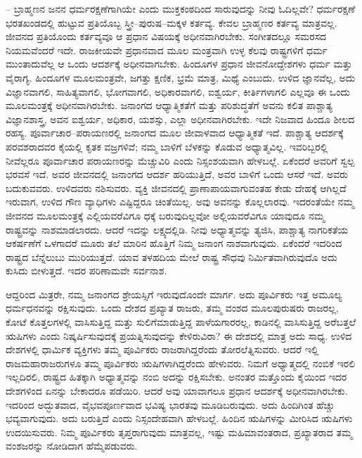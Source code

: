 – ಬ್ರಾಹ್ಮಣನ ಜನನ ಧರ್ಮರಕ್ಷಣೆಗಾಗಿಯೇ ಎಂದು ಮುಕ್ತಕಂಠದಿಂದ ಸಾರುವುದನ್ನು ನೀವು ಓದಿಲ್ಲವೇ? ಧರ್ಮರಕ್ಷಣೆ ಭರತಖಂಡದಲ್ಲಿ ಹುಟ್ಟುವ ಪ್ರತಿಯೊಬ್ಬ ಸ್ತ್ರೀ–ಪುರುಷ–ಮಕ್ಕಳ ಕರ್ತವ್ಯ. ಕೇವಲ ಬ್ರಾಹ್ಮಣರ ಕರ್ತವ್ಯ ಮಾತ್ರವಲ್ಲ. ಜೀವನದ ಪ್ರತಿಯೊಂದು ಕರ್ತವ್ಯವೂ ಆ ಪ್ರಧಾನ ವಿಷಯಕ್ಕೆ ಅಧೀನವಾಗಿರಬೇಕು. ಸಂಗೀತದಲ್ಲೂ ಸಮರಸದ ನಿಯಮವೆಂದರೆ ಇದೇ. ರಾಜಕೀಯವೇ ಪ್ರಧಾನವಾದ ಮೂಲ ಮಂತ್ರವಾಗಿ ಉಳ್ಳ ಕೆಲವು ರಾಷ್ಟ್ರಗಳಿಗೆ ಧರ್ಮ ಮುಂತಾದುವೆಲ್ಲ ಆ ಒಂದು ಆದರ್ಶಕ್ಕೆ ಅಧೀನವಾಗಬೇಕು. ಹಿಂದೂಗಳ ಪ್ರಧಾನ ಜೀವನೋದ್ದೇಶಗಳು ಧರ್ಮ ಮತ್ತು ವೈರಾಗ್ಯ. ಹಿಂದೂಗಳ ಮೂಲಮಂತ್ರವೇ, ಜಗತ್ತು ಕ್ಷಣಿಕ, ಭ್ರಮೆ ಮಾತ್ರ, ಮಿಥ್ಯೆ ಎಂಬುದು. ಉಳಿದ ಜ್ಞಾನವೆಲ್ಲ, ಅದು ವಿಜ್ಞಾನವಾಗಲಿ, ಸಾಹಿತ್ಯವಾಗಲಿ, ಭೋಗವಾಗಲಿ, ಅಧಿಕಾರವಾಗಲಿ, ಐಶ್ವರ್ಯ, ಕೀರ್ತಿಗಳಾಗಲಿ ಎಲ್ಲವೂ ಈ ಒಂದು ಮೂಲಮಂತ್ರಕ್ಕೆ ಅಧೀನವಾಗಿರಬೇಕು. ಜನಾಂಗದ ಆಧ್ಯಾತ್ಮಿಕತೆಗೆ ಮತ್ತು ಪರಿಶುದ್ಧತೆಗೆ ಅವನು ಕಲಿತ ಪಾಶ್ಚಾತ್ಯ ವಿಜ್ಞಾನಶಾಸ್ತ್ರ, ಅವನ ಐಶ್ವರ್ಯ, ಅಧಿಕಾರ, ಯಶಸ್ಸು, ಎಲ್ಲಾ ಅಧೀನವಾಗಿರಬೇಕು. ಇದೇ ನಿಜವಾದ ಹಿಂದೂ ಶೀಲದ ರಹಸ್ಯ. ಪೂರ್ವಾಚಾರ–ಪರಾಯಣರಲ್ಲಿ ಜನಾಂಗದ ಮೂಲ ಜೀವಾಳವಾದ ಆಧ್ಯಾತ್ಮಿಕತೆ ಇದೆ. ಪಾಶ್ಚಾತ್ಯ ಆದರ್ಶಕ್ಕೆ ಪರವಶರಾದವರ ಕೈಯಲ್ಲಿ ಕೃತಕ ವಜ್ರಗಳಿವೆ; ನಮ್ಮ ಬಾಳಿಗೆ ಬೆಳಕನ್ನು ಕೊಡುವ ಅಧ್ಯಾತ್ಮವಿಲ್ಲ. ಇವರಿಬ್ಬರಲ್ಲಿ ನೀವೆಲ್ಲರೂ ಪೂರ್ವಾಚಾರ ಪರಾಯಣರನ್ನು ಮೆಚ್ಚುವಿರಿ ಎಂದು ನಿಸ್ಸಂಶಯವಾಗಿ ಹೇಳಬಲ್ಲೆ. ಏಕೆಂದರೆ ಅವರಿಗೆ ಸ್ವಲ್ಪ ಭರವಸೆ ಇದೆ. ಅವರ ಜೀವನದಲ್ಲಿ ಜನಾಂಗದ ಆದರ್ಶ ಹರಿಯುತ್ತಿದೆ, ಅವರ ಬಾಳಿಗೆ ಒಂದು ಆಸರೆ ಇದೆ. ಅವರು ಬದುಕುವವರು. ಉಳಿದವರು ನಶಿಸುವರು. ವ್ಯಕ್ತಿ ಜೀವನದಲ್ಲಿ ಪ್ರಾಣಾಪಾಯವಾಗುವಂತಹ ಕೇಡು ದೇಹಕ್ಕೆ ಆಗಿಲ್ಲದೆ ಇರುವಾಗ, ಉಳಿದ ಗೌಣ ವ್ಯಾಧಿಗಳು ಎಷ್ಟಿದ್ದರೂ ಚಿಂತೆಯಿಲ್ಲ. ಅವು ಅವನನ್ನು ಕೊಲ್ಲಲಾರವು. ಇದರಂತೆಯೇ ನಮ್ಮ ಜೀವನದ ಮೂಲಮಂತ್ರಕ್ಕೆ ಎಲ್ಲಿಯವರೆವಿಗೂ ಧಕ್ಕೆ ಬರುವುದಿಲ್ಲವೋ ಅಲ್ಲಿಯವರೆವಿಗೂ ಯಾವುದೂ ನಮ್ಮ ರಾಷ್ಟ್ರವನ್ನು ನಾಶಮಾಡಲಾರದು. ಆದರೆ ಇದನ್ನು ಲಕ್ಷ್ಯದಲ್ಲಿಡಿ. ನೀವು ಅಧ್ಯಾತ್ಮವನ್ನು ತ್ಯಜಿಸಿ, ಪಾಶ್ಚಾತ್ಯ ನಾಗರಿಕತೆಯ ಆಕರ್ಷಣೆಗೆ ಒಳಗಾದರೆ ಮೂರು ತಲೆ ಮಾರಿನ ಹೊತ್ತಿಗೆ ನಿಮ್ಮ ಜನಾಂಗ ನಾಶವಾಗುವುದು. ಏಕೆಂದರೆ ಇದರಿಂದ ರಾಷ್ಟ್ರದ ಬೆನ್ನೆಲುಬು ಮುರಿಯುತ್ತದೆ. ಯಾವ ತಳಹದಿಯ ಮೇಲೆ ರಾಷ್ಟ್ರ ಸೌಧವು ನಿರ್ಮಿತವಾಗಿರುವುದೊ ಅದು ಕುಸಿದು ಬೀಳುತ್ತದೆ. ಇದರ ಪರಿಣಾಮವೇ ಸರ್ವನಾಶ.

ಆದ್ದರಿಂದ ಮಿತ್ರರೇ, ನಮ್ಮ ಜನಾಂಗದ ಶ್ರೇಯಸ್ಸಿಗೆ ಇರುವುದೊಂದೇ ಮಾರ್ಗ. ಅದು ಪೂರ್ವಿಕರು ಇತ್ತ ಅಮೂಲ್ಯ ಧರ್ಮಧನವನ್ನು ರಕ್ಷಿಸುವುದು. ಒಂದು ದೇಶದ ಪ್ರಖ್ಯಾತ ರಾಜರು, ತಮ್ಮ ವಂಶದ ಮೂಲಪುರುಷರು ರಾಜರಲ್ಲ, ಕೋಟೆ ಕೊತ್ತಲಗಳಲ್ಲಿ ವಾಸಿಸುತ್ತಿದ್ದ ಮತ್ತು ಸುಲಿಗೆಮಾಡುತ್ತಿದ್ದ ಪಾಳೆಯಗಾರರಲ್ಲ, ಕಾಡಿನಲ್ಲಿ ವಾಸಿಸುತ್ತಿದ್ದ ಅರೆಬತ್ತಲೆ ಋಷಿಗಳು ಎಂದು ನಿಷ್ಕರ್ಷಿಸುವುದಕ್ಕೆ ಪ್ರಯತ್ನಿಸುವುದನ್ನು ಕೇಳಿರುವಿರಾ? ಈ ದೇಶದಲ್ಲಿ ಮಾತ್ರ ಅದು ಸಾಧ್ಯ. ಉಳಿದ ದೇಶಗಳಲ್ಲಿ ಧಾರ್ಮಿಕ ವ್ಯಕ್ತಿಗಳು ತಮ್ಮ ಪೂರ್ವಿಕರು ರಾಜರಾಗಿದ್ದರೆಂದು ತೋರಲೆತ್ನಿಸುವರು. ಆದರೆ ಇಲ್ಲಿ ರಾಜಮಹಾರಾಜರುಗಳೂ ತಮ್ಮ ಪೂರ್ವಿಕರು ಋಷಿಗಳಾಗಿದ್ದರೆಂದು ಹೇಳುವರು. ನಿಮಗೆ ಅಧ್ಯಾತ್ಮದಲ್ಲಿ ನಂಬಿಕೆ ಇರಲಿ ಇಲ್ಲದಿರಲಿ, ರಾಷ್ಟ್ರದ ಹಿತಕ್ಕಾಗಿ ಅಧ್ಯಾತ್ಮವನ್ನು ನಂಬಿ ಅದನ್ನು ರಕ್ಷಿಸಬೇಕು. ಅನಂತರ ಮತ್ತೊಂದು ಕೈಯಿಂದ ಇದರ ದೇಶಗಳಿಂದ ಏನನ್ನು ಬೇಕಾದರೂ ಪಡೆಯಿರಿ. ಆದರೆ ಅವು ಯಾವಾಗಲೂ ಪ್ರಧಾನ ಆದರ್ಶಕ್ಕೆ ಅಧೀನವಾಗಿರಬೇಕು. ಇದರಿಂದ ಅದ್ಭುತವಾದ, ವೈಭವಪೂರ್ಣವಾದ ಭವಿಷ್ಯ ಭಾರತವು ಮೂಡಿಬರುವುದು. ಅದು ಹಿಂದಿಗಿಂತ ಹೆಚ್ಚು ಭವ್ಯವಾಗುವುದು. ಅದು ಬರುತ್ತಿದೆ ಎಂದು ನಿಸ್ಸಂದೇಹವಾಗಿ ಹೇಳಬಲ್ಲೆ. ಹಿಂದಿನ ಋಷಿಗಳನ್ನು ಮೀರಿಸಿದ ಋಷಿಗಳು ಉದಯಿಸುವರು. ನಿಮ್ಮ ಪೂರ್ವಿಕರು ತೃಪ್ತರಾಗುವುದು ಮಾತ್ರವಲ್ಲ, ಇಷ್ಟು ಮಹಿಮಾವಂತರಾದ, ಪ್ರಖ್ಯಾತರಾದ ತಮ್ಮ ವಂಶಜರನ್ನು ನೋಡಿದಾಗ ಹೆಮ್ಮೆಪಡುವರು.


